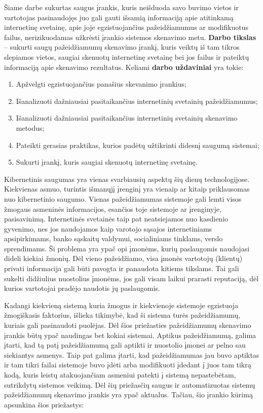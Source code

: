 Šiame darbe sukurtas saugus įrankis, kuris neišduoda savo buvimo vietos ir vartotojas pasinaudojęs juo gali gauti išsamią informaciją apie atitinkamą internetinę svetainę, apie joje egzistuojančius pažeidžiamumus ar modifikuotus failus, nerizikuodamas užkrėsti įrankio sistemos skenavimo metu. \textbf{Darbo tikslas} – sukurti saugų pažeidžiamumų skenavimo įrankį, kuris veiktų iš tam tikros slepiamos vietos, saugiai skenuotų internetinę
svetainę bei jos failus ir pateiktų informaciją apie skenavimo rezultatus. Keliami \textbf{darbo uždaviniai} yra tokie:

\begin{enumerate}
	\item Apžvelgti egzistuojančius panašius skevanimo įrankius;
	\item Išanalizuoti dažniausiai pasitaikančius internetinių svetainių pažeidžiamumus;
	\item Išanalizuoti dažniausiai pasitaikančius internetinių svetainių skenavimo metodus;
	\item Pateikti gerasias praktikas, kurios padėtų užtikrinti didesnį saugumą sistemai;
	\item Sukurti įrankį, kuris saugiai skenuotų internetinę svetainę.
\end{enumerate}


Kibernetinis saugumas yra vienas svarbiausių aspektų šių dienų technologijose. Kiekvienas asmuo, turintis išmanųjį įrenginį yra vienaip ar kitaip priklausomas nuo kibernetinio saugumo. Vienas pažeidžiamumas sistemoje gali lemti visos žmogaus asmeninės informacijos, esančios toje sistemoje ar įrenginyje, pasisavinimą. Internetinės svetainės taip pat neatsiejamos nuo kasdienio gyvenimo, nes jos naudojamos kaip varotojo sąsajos internetiniams apsipirkimams, banko sąskaitų valdymui, socialiniams tinklams, verslo sprendimams. Ši problema yra ypač opi įmonėms, kurių paslaugomis naudojasi dideli kiekiai žmonių. Dėl vieno pažeidžiamo, visa įmonės vartotojų (klientų) privati informacija gali būti pavogta ir panaudota kitiems tikslams. Tai gali sukelti didžiulius nuostolius įmonėms, jos gali visam laikui prarasti reputaciją, dėl kurios vartotojai pradėjo naudotis jų paslaugomis.

Kadangi kiekvieną sistemą kuria
žmogus ir kiekvienoje sistemoje egzistuoja žmogiškasis faktorius, išlieka tikimybė, kad ši sistema turės
pažeidžiamumų, kuriais gali pasinaudoti puolėjas. Dėl šios priežasties
pažeidžiamumų skenavimo įrankis būtų ypač naudingas bet kokiai sistemai. Aptikus pažeidžiamumą, galima įtarti, kad
tą patį pažeidžiamumą gali aptikti ir nuostolio įmonei ar pelno sau siekiantys asmenys. Taip pat galima įtarti, kad pažeidžiamumas jau buvo aptiktas ir tam tikri
failai sistemoje buvo įdėti arba modifikuoti įdedant į juos tam tikrą kodą, kuris leistų atakuojančiam asmeniui patekti į sistemą
nepastebėtam, sutrikdytų sistemos veikimą.
Dėl šių priežasčių saugus ir automatizuotas sistemų pažeidžiamumų skenavimo įrankis yra
ypač aktualus. Tačiau, šio įrankio kūrimą apsunkina šios priežastys:


